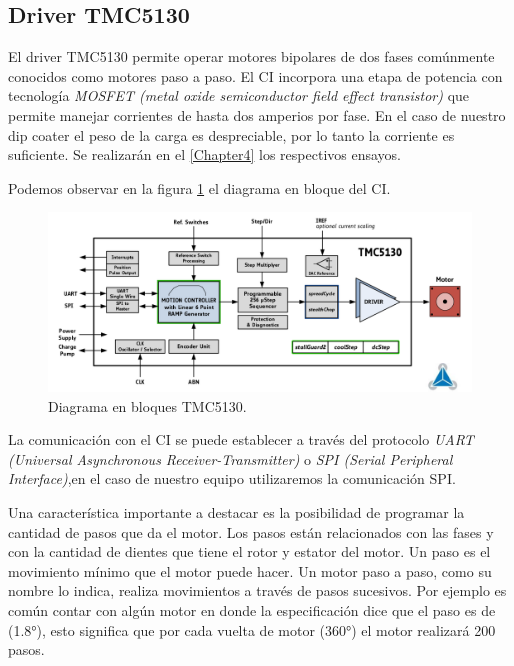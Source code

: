   
\subsection{Driver TMC5130}

El driver TMC5130 permite operar motores bipolares de dos fases comúnmente conocidos como motores paso a paso. El CI incorpora una etapa de potencia con tecnología \textit{MOSFET (metal oxide semiconductor field effect transistor)}  que permite manejar corrientes de hasta dos amperios por fase. En el caso de nuestro dip coater el peso de la carga es despreciable, por lo tanto la corriente es suficiente. Se realizarán en el \ref{Chapter4} los respectivos ensayos.

Podemos observar en la figura \ref{fig:tmc5130_diagrama} el diagrama en bloque del CI.

\begin{figure}[htpb]
\centering 
\includegraphics[width=1.1\textwidth]{./Figures/tmc5130_diagrama.png}
\caption{Diagrama en bloques TMC5130.}
\label{fig:tmc5130_diagrama}
\end{figure}

La comunicación con el CI se puede establecer a través del protocolo \textit{ UART (Universal Asynchronous Receiver-Transmitter)} o \textit{SPI (Serial Peripheral Interface)},en el caso de nuestro equipo utilizaremos la comunicación SPI.


Una característica importante a destacar es la posibilidad de programar la cantidad de pasos que da el motor. Los pasos están relacionados con las fases  y con la cantidad de dientes que tiene el rotor y estator del motor. Un paso es el movimiento mínimo que el motor puede hacer. Un motor paso a paso, como su nombre lo indica, realiza movimientos a través de pasos sucesivos. Por ejemplo es común contar con algún motor en donde la especificación dice que el paso es de (\ang{1.8}), esto significa que por cada vuelta de motor (\ang{360}) el motor realizará 200 pasos.

